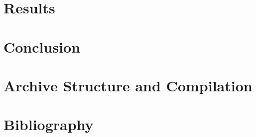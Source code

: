 \documentclass[11pt,twoside,a4paper]{book}
\begin{document}
\chapter{Results} \label{chap:results}


\chapter{Conclusion} \label{chap:conclusion}


\appendix
\chapter{Archive Structure and Compilation} \label{chap:appendix}


\chapter*{Bibliography}
\printbibliography[heading=none]
\end{document}
